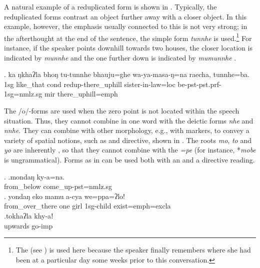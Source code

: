A natural example of a reduplicated form is shown in \Next. Typically, the reduplicated forms contrast an object further away with a closer object. In this example, however, the emphasis usually connected to this  is not very strong;  in the afterthought at  the end of the sentence, the simple form \emph{tunnhe} is used.\footnote{The  (see )  is used here because the speaker finally remembers where she had been at a particular day some weeks prior to this conversation.} For instance, if the speaker points downhill towards two houses, the closer location is indicated by \emph{munnhe}  and the one further down is indicated by \emph{mumunnhe} . 

	\exg. ka  ŋkhaʔla bhoŋ tu-tunnhe         bhauju=ghe               wa-ya-masa-ŋ=na                        raecha, tunnhe=ba.\\
	{\sc 1sg} like\_that {\sc cond} {\sc redup}-there\_uphill sister-in-law{\sc =loc} be{\sc -pst-pst.prf-1sg=nmlz.sg} {\sc mir} there\_uphill{\sc =emph}\\
 


The /o/-forms are used when the zero point is not located within the speech situation. Thus, they cannot combine in one word with the deictic forms \emph{nhe} and \emph{nnhe}. They can combine with other morphology, e.g., with  markers, to convey a variety of spatial notions, such as  and directive, shown in \Next. The roots \emph{mo}, \emph{to} and \emph{yo} are inherently , so that they cannot combine with the  \emph{=pe} (for instance, *\emph{mobe} is ungrammatical). Forms as in \Next[a] can be used both with an  and a directive reading.

\ex. \ag.mondaŋ ky-a=na.\\
from\_below come\_up{\sc [3sg]-pst=nmlz.sg}\\
\bg. yondaŋ    eko mamu a-cya            we=ppa=ʔlo!\\
from\_over\_there one girl {\sc 1sg-}child exist{\sc [3sg;npst]=emph=excla}\\
 
\bg.tokhaʔla khy-aǃ\\
upwards go{\sc -imp}\\

